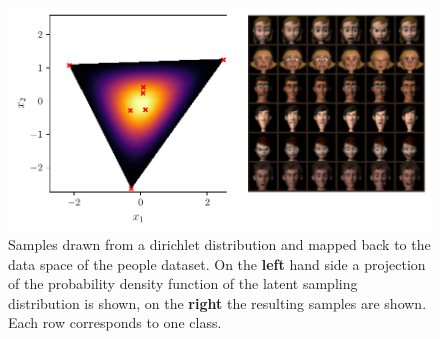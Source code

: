 \begin{figure}[htpb]
	\centering
	\includegraphics[width=1\linewidth]{figures/samples/aa_ferg.pdf}
	\caption{Samples drawn from a dirichlet distribution and mapped back to
		the data space of the people dataset. On the \textbf{left} hand side a
		projection of the probability density function of the latent
		sampling distribution is shown, on the \textbf{right} the resulting samples
		are shown. Each row corresponds to one class.}%
	\label{fig:aa_ferg}
\end{figure}

